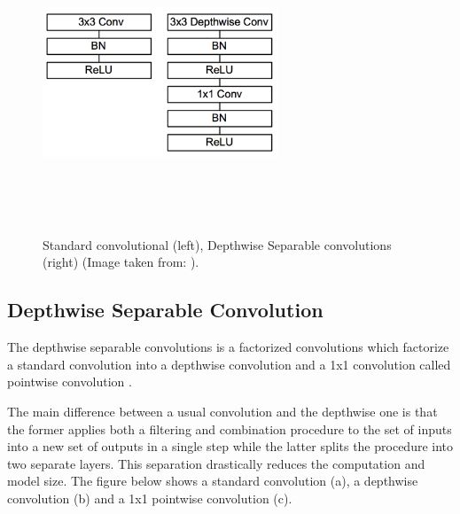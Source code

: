 \begin{figure}[!htbp]
\begin{center}
\includegraphics[width=7cm,height=9cm,keepaspectratio]{images/mobileNet_contrast.png}
\end{center}
\caption{Standard convolutional (left), Depthwise Separable convolutions (right) (Image taken from: \cite{paper:MobileNets}).}
\end{figure}

\subsection{Depthwise Separable Convolution}

The depthwise separable convolutions is a factorized convolutions which factorize a standard convolution into a depthwise convolution and a 1x1 convolution called pointwise convolution \cite{paper:MobileNets}.

The main difference between a usual convolution and the depthwise one is that the former applies both a filtering and combination procedure to the set of inputs into a new set of outputs in a single step \cite{paper:MobileNets} while the latter splits the procedure into two separate layers. This separation drastically reduces the computation and model size. The figure below shows a standard convolution (a), a depthwise convolution (b) and a 1x1 pointwise convolution (c).

